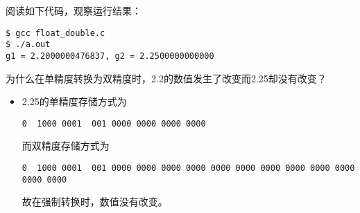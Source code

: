 %
\begin{frame}[fragile]
阅读如下代码，观察运行结果：

\end{frame}
%
\begin{frame}[fragile]
\begin{lstlisting}[backgroundcolor=\color{red!10}]
$ gcc float_double.c
$ ./a.out
g1 = 2.2000000476837, g2 = 2.2500000000000
\end{lstlisting}
\end{frame}
%
\begin{frame}[fragile]
\begin{wenti}

为什么在单精度转换为双精度时，2.2的数值发生了改变而2.25却没有改变？
\end{wenti} 
\end{frame}
%
\begin{frame}[fragile]

\begin{itemize}
\item 2.25的单精度存储方式为
\begin{lstlisting}
0  1000 0001  001 0000 0000 0000 0000
\end{lstlisting}
而双精度存储方式为
\begin{lstlisting}
0  1000 0001  001 0000 0000 0000 0000 0000 0000 0000 0000 0000 0000 0000 0000
\end{lstlisting}
故在强制转换时，数值没有改变。
\end{itemize}

\end{frame}

